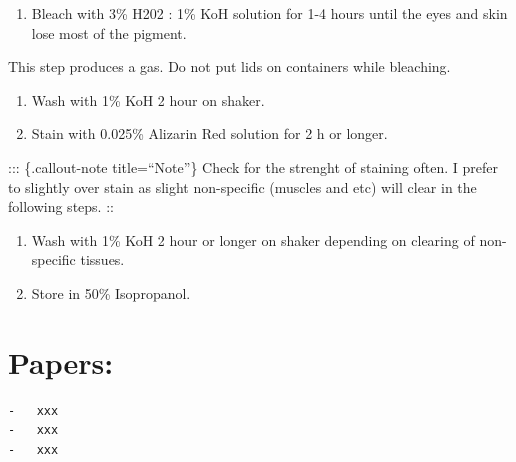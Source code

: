 \documentclass[
  letterpaper,
  DIV=11,
  numbers=noendperiod]{scrreprt}
\providecommand{\tightlist}{%
  \setlength{\itemsep}{0pt}\setlength{\parskip}{0pt}}\usepackage{longtable,booktabs,array}
\begin{document}
\begin{enumerate}
\def\labelenumi{\arabic{enumi}.}
\setcounter{enumi}{2}
\tightlist
\item
  Bleach with 3\% H202 : 1\% KoH solution for 1-4 hours until the eyes
  and skin lose most of the pigment.
\end{enumerate}

\begin{tcolorbox}[enhanced jigsaw, rightrule=.15mm, title=\textcolor{quarto-callout-note-color}{\faInfo}\hspace{0.5em}{Warning}, titlerule=0mm, opacitybacktitle=0.6, toprule=.15mm, bottomrule=.15mm, opacityback=0, left=2mm, colframe=quarto-callout-note-color-frame, breakable, coltitle=black, colback=white, colbacktitle=quarto-callout-note-color!10!white, bottomtitle=1mm, leftrule=.75mm, toptitle=1mm, arc=.35mm]

This step produces a gas. Do not put lids on containers while bleaching.

\end{tcolorbox}

\begin{enumerate}
\def\labelenumi{\arabic{enumi}.}
\setcounter{enumi}{3}
\item
  Wash with 1\% KoH 2 hour on shaker.
\item
  Stain with 0.025\% Alizarin Red solution for 2 h or longer.
\end{enumerate}

::: \{.callout-note title=``Note''\} Check for the strenght of staining
often. I prefer to slightly over stain as slight non-specific (muscles
and etc) will clear in the following steps. ::

\begin{enumerate}
\def\labelenumi{\arabic{enumi}.}
\setcounter{enumi}{5}
\item
  Wash with 1\% KoH 2 hour or longer on shaker depending on clearing of
  non-specific tissues.
\item
  Store in 50\% Isopropanol.
\end{enumerate}

\hypertarget{papers-1}{%
\section{Papers:}\label{papers-1}}

\begin{verbatim}
-   xxx
-   xxx
-   xxx
\end{verbatim}
\end{document}
